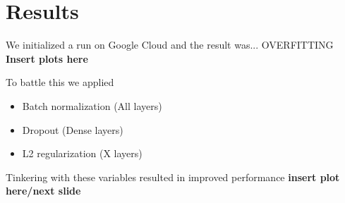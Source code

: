 \documentclass{beamer}
\begin{document}
\section{Results}
\begin{frame}
  We initialized a run on Google Cloud and the result was... OVERFITTING
  \textbf{Insert plots here}
\end{frame}

\begin{frame}
  To battle this we applied
  \begin{itemize}
    \item Batch normalization (All layers)
    \item Dropout (Dense layers)
    \item L2 regularization (X layers)
  \end{itemize}
  Tinkering with these variables resulted in improved performance \textbf{insert plot here/next slide}
\end{frame}
\end{document}
